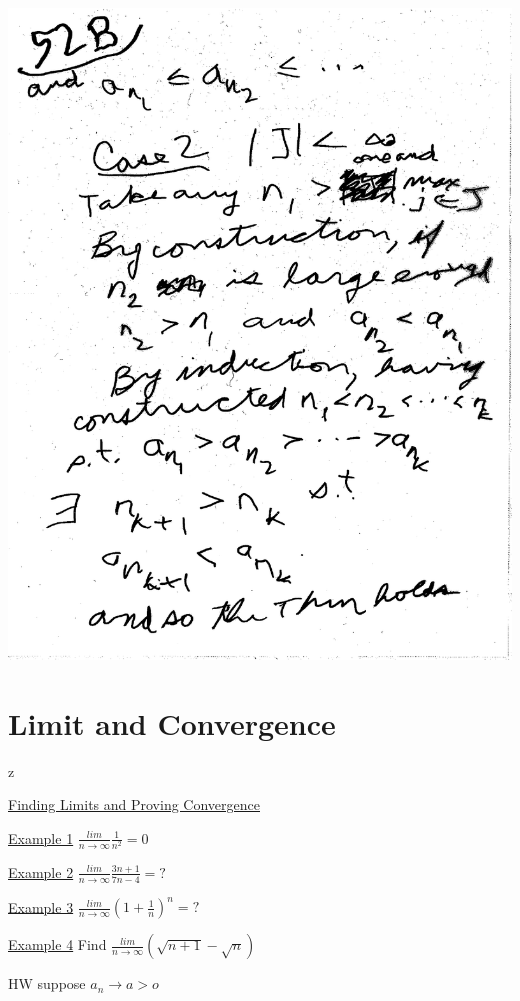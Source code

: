 \documentclass[10pt,a4paper]{article}
\begin{document}
{{\includegraphics[scale=.5]{Pages/SL_11} 

\newpage
\section{Limit and Convergence}

\newpage

z

\underline{Finding Limits and Proving Convergence}

\underline{Example 1} $\frac{lim}{n \rightarrow \infty}  \frac{1}{n^2} = 0$

\underline{Example 2} $\frac{lim}{n \rightarrow \infty} \frac{3n +1}{7n-4} = ?$

\underline{Example 3} $\frac{lim}{n \rightarrow \infty} (1+ \frac{1}{n})^n = ?$

\underline{Example 4} Find $\frac{lim}{n \rightarrow \infty} (\sqrt{n+1}-\sqrt{n})$

HW suppose $a_n \rightarrow a > o$

}}
\end{document}
